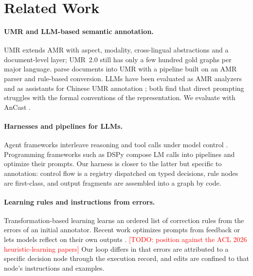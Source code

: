 \documentclass[11pt]{article}
\newcommand{\umr}{\textsc{UMR}\xspace}
\newcommand{\amr}{\textsc{AMR}\xspace}
\newcommand{\todo}[1]{\textcolor{red}{[TODO: #1]}}
\begin{document}
\section{Related Work}

\paragraph{UMR and LLM-based semantic annotation.}
\umr \citep{bonn2023umr,gysel2021design} extends \amr \citep{banarescu2013amr} with aspect, modality, cross-lingual abstractions and a document-level layer; UMR~2.0 \citep{bonn2025umr2} still has only a few hundred gold graphs per major language. \citet{chun2024pipeline} parse documents into \umr with a pipeline built on an \amr parser and rule-based conversion. LLMs have been evaluated as \amr analyzers \citep{ettinger2023expert} and as assistants for Chinese \umr annotation \citep{sun2024chinese}; both find that direct prompting struggles with the formal conventions of the representation. We evaluate with AnCast \citep{sun2024ancast}.

\paragraph{Harnesses and pipelines for LLMs.}
Agent frameworks interleave reasoning and tool calls under model control \citep{yao2023react}. Programming frameworks such as DSPy \citep{khattab2024dspy} compose LM calls into pipelines and optimize their prompts. Our harness is closer to the latter but specific to annotation: control flow is a registry dispatched on typed decisions, rule nodes are first-class, and output fragments are assembled into a graph by code.

\paragraph{Learning rules and instructions from errors.}
Transformation-based learning \citep{brill1995transformation} learns an ordered list of correction rules from the errors of an initial annotator. Recent work optimizes prompts from feedback \citep{zhou2023ape,pryzant2023protegi,yang2024opro,yuksekgonul2025textgrad} or lets models reflect on their own outputs \citep{madaan2023selfrefine,shinn2023reflexion}. \todo{position against the ACL 2026 heuristic-learning papers} Our loop differs in that errors are attributed to a specific decision node through the execution record, and edits are confined to that node's instructions and examples.
\end{document}
